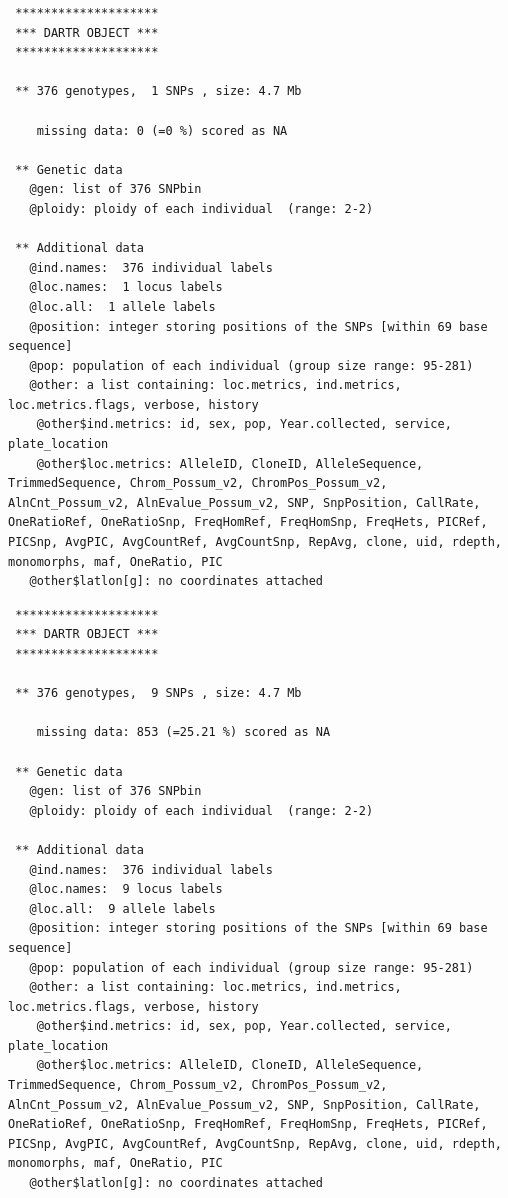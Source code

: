 \documentclass[
  letterpaper,
  DIV=11,
  numbers=noendperiod]{scrreprt}
\newenvironment{Shaded}{\begin{snugshade}}{\end{snugshade}}
\newcommand{\NormalTok}[1]{\textcolor[rgb]{0.00,0.44,0.13}{#1}}
\newcommand{\SpecialCharTok}[1]{\textcolor[rgb]{0.25,0.44,0.63}{#1}}
\begin{document}
\begin{verbatim}
 ********************
 *** DARTR OBJECT ***
 ********************

 ** 376 genotypes,  1 SNPs , size: 4.7 Mb

    missing data: 0 (=0 %) scored as NA

 ** Genetic data
   @gen: list of 376 SNPbin
   @ploidy: ploidy of each individual  (range: 2-2)

 ** Additional data
   @ind.names:  376 individual labels
   @loc.names:  1 locus labels
   @loc.all:  1 allele labels
   @position: integer storing positions of the SNPs [within 69 base sequence]
   @pop: population of each individual (group size range: 95-281)
   @other: a list containing: loc.metrics, ind.metrics, loc.metrics.flags, verbose, history 
    @other$ind.metrics: id, sex, pop, Year.collected, service, plate_location 
    @other$loc.metrics: AlleleID, CloneID, AlleleSequence, TrimmedSequence, Chrom_Possum_v2, ChromPos_Possum_v2, AlnCnt_Possum_v2, AlnEvalue_Possum_v2, SNP, SnpPosition, CallRate, OneRatioRef, OneRatioSnp, FreqHomRef, FreqHomSnp, FreqHets, PICRef, PICSnp, AvgPIC, AvgCountRef, AvgCountSnp, RepAvg, clone, uid, rdepth, monomorphs, maf, OneRatio, PIC 
   @other$latlon[g]: no coordinates attached
\end{verbatim}

\begin{Shaded}
\end{Shaded}

\begin{verbatim}
 ********************
 *** DARTR OBJECT ***
 ********************

 ** 376 genotypes,  9 SNPs , size: 4.7 Mb

    missing data: 853 (=25.21 %) scored as NA

 ** Genetic data
   @gen: list of 376 SNPbin
   @ploidy: ploidy of each individual  (range: 2-2)

 ** Additional data
   @ind.names:  376 individual labels
   @loc.names:  9 locus labels
   @loc.all:  9 allele labels
   @position: integer storing positions of the SNPs [within 69 base sequence]
   @pop: population of each individual (group size range: 95-281)
   @other: a list containing: loc.metrics, ind.metrics, loc.metrics.flags, verbose, history 
    @other$ind.metrics: id, sex, pop, Year.collected, service, plate_location 
    @other$loc.metrics: AlleleID, CloneID, AlleleSequence, TrimmedSequence, Chrom_Possum_v2, ChromPos_Possum_v2, AlnCnt_Possum_v2, AlnEvalue_Possum_v2, SNP, SnpPosition, CallRate, OneRatioRef, OneRatioSnp, FreqHomRef, FreqHomSnp, FreqHets, PICRef, PICSnp, AvgPIC, AvgCountRef, AvgCountSnp, RepAvg, clone, uid, rdepth, monomorphs, maf, OneRatio, PIC 
   @other$latlon[g]: no coordinates attached
\end{verbatim}
\end{document}
